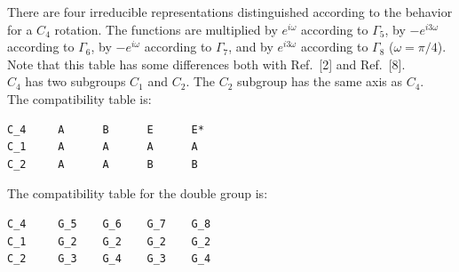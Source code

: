 \documentclass[12pt,a4paper]{article}
\begin{document}
There are four irreducible representations distinguished according
to the behavior for a $C_4$ rotation. The functions are multiplied by 
$e^{i\omega}$ according to $\Gamma_5$, by $-e^{i3\omega}$ according to 
$\Gamma_6$, by $-e^{i\omega}$ according to $\Gamma_7$, and by $e^{i3\omega}$ 
according to $\Gamma_8$ ($\omega=\pi/4$). Note that this table has some
differences both with Ref.~[2] and Ref.~[8].\\
$C_4$ has two subgroups $C_1$ and $C_2$. The $C_2$ subgroup has the same axis
as $C_4$. \\
The compatibility table is:
\begin{verbatim}
C_4     A      B      E      E*  
C_1     A      A      A      A
C_2     A      A      B      B
\end{verbatim}
The compatibility table for the double group is:
\begin{verbatim}
C_4     G_5    G_6    G_7    G_8 
C_1     G_2    G_2    G_2    G_2
C_2     G_3    G_4    G_3    G_4
\end{verbatim}

\newpage
\end{document}
